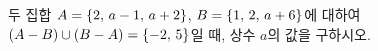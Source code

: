 두 집합 $A=\{2,\mkern3mu a-1,\mkern3mu a+2\}$, $B=\{1,\mkern3mu 2,\mkern3mu a+6\}$에 대하여 $(A-B)\cup(B-A)=\{-2,\mkern3mu 5\}$일 때, 상수 $a$의 값을 구하시오.
